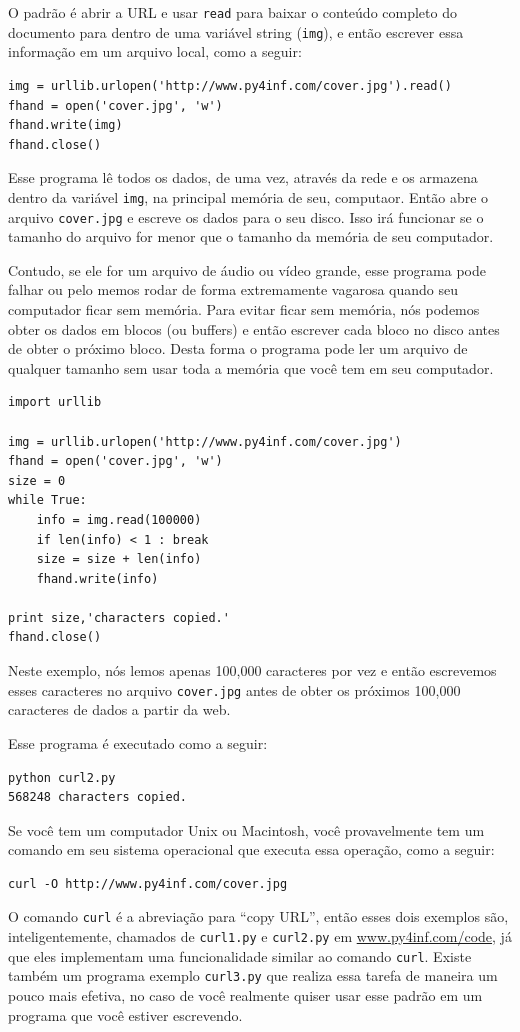O padrão é abrir a URL e usar {\tt read} para baixar o conteúdo completo
do documento para dentro de uma variável string ({\tt img}), e então
escrever essa informação em um arquivo local, como a seguir:

\beforeverb
\begin{verbatim}
img = urllib.urlopen('http://www.py4inf.com/cover.jpg').read()
fhand = open('cover.jpg', 'w')
fhand.write(img)
fhand.close()
\end{verbatim}
\afterverb
%
Esse programa lê todos os dados, de uma vez, através da rede e 
os armazena dentro da variável {\tt img}, na principal memória de seu,
computaor. Então abre o arquivo {\tt cover.jpg} e escreve os dados para
o seu disco.  Isso irá funcionar se o tamanho do arquivo for menor que
o tamanho da memória de seu computador.

Contudo, se ele for um arquivo de áudio ou vídeo grande, esse programa
pode falhar ou pelo memos rodar de forma extremamente vagarosa quando seu
computador ficar sem memória.  Para evitar ficar sem memória, nós podemos
obter os dados em blocos (ou buffers) e então escrever cada bloco no disco
antes de obter o próximo bloco.  Desta forma o programa pode ler um arquivo
de qualquer tamanho sem usar toda a memória que você tem em seu computador.

\beforeverb
\begin{verbatim}
import urllib

img = urllib.urlopen('http://www.py4inf.com/cover.jpg')
fhand = open('cover.jpg', 'w')
size = 0
while True:
    info = img.read(100000)
    if len(info) < 1 : break
    size = size + len(info)
    fhand.write(info)

print size,'characters copied.'
fhand.close()
\end{verbatim}
\afterverb
%
Neste exemplo, nós lemos apenas 100,000 caracteres por vez e então 
escrevemos esses caracteres no arquivo {\tt cover.jpg} antes de obter
os próximos 100,000 caracteres de dados a partir da web.

Esse programa é executado como a seguir:

\beforeverb
\begin{verbatim}
python curl2.py 
568248 characters copied.
\end{verbatim}
\afterverb
%

Se você tem um computador Unix ou Macintosh, você provavelmente tem um
comando em seu sistema operacional que executa essa operação,
como a seguir:

\beforeverb
\begin{verbatim}
curl -O http://www.py4inf.com/cover.jpg
\end{verbatim}
\afterverb
%
O comando {\tt curl} é a abreviação para ``copy URL'', então esses dois 
exemplos são, inteligentemente, chamados de {\tt curl1.py} e {\tt curl2.py} em 
\url{www.py4inf.com/code}, já que eles implementam uma funcionalidade similar
ao comando {\tt curl}.  Existe também um programa exemplo {\tt curl3.py} que
realiza essa tarefa de maneira um pouco mais efetiva, no caso de você
realmente quiser usar esse padrão em um programa que você estiver escrevendo.

